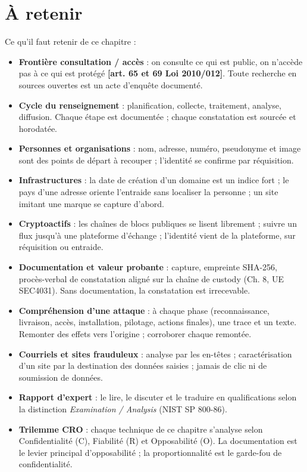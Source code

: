 \section{À retenir}

\begin{boxresume}
Ce qu'il faut retenir de ce chapitre :

\begin{itemize}
\item \textbf{Frontière consultation / accès} : on consulte ce qui est public, on n'accède pas à ce qui est protégé \textbf{[art. 65 et 69 Loi 2010/012]}. Toute recherche en sources ouvertes est un acte d'enquête documenté.

\item \textbf{Cycle du renseignement} : planification, collecte, traitement, analyse, diffusion. Chaque étape est documentée ; chaque constatation est sourcée et horodatée.

\item \textbf{Personnes et organisations} : nom, adresse, numéro, pseudonyme et image sont des points de départ à recouper ; l'identité se confirme par réquisition.

\item \textbf{Infrastructures} : la date de création d'un domaine est un indice fort ; le pays d'une adresse oriente l'entraide sans localiser la personne ; un site imitant une marque se capture d'abord.

\item \textbf{Cryptoactifs} : les chaînes de blocs publiques se lisent librement ; suivre un flux jusqu'à une plateforme d'échange ; l'identité vient de la plateforme, sur réquisition ou entraide.

\item \textbf{Documentation et valeur probante} : capture, empreinte SHA-256, procès-verbal de constatation aligné sur la chaîne de custody (Ch. 8, UE SEC4031). Sans documentation, la constatation est irrecevable.

\item \textbf{Compréhension d'une attaque} : à chaque phase (reconnaissance, livraison, accès, installation, pilotage, actions finales), une trace et un texte. Remonter des effets vers l'origine ; corroborer chaque remontée.

\item \textbf{Courriels et sites frauduleux} : analyse par les en-têtes ; caractérisation d'un site par la destination des données saisies ; jamais de clic ni de soumission de données.

\item \textbf{Rapport d'expert} : le lire, le discuter et le traduire en qualifications selon la distinction \textit{Examination / Analysis} (NIST SP 800-86).

\item \textbf{Trilemme CRO} : chaque technique de ce chapitre s'analyse selon Confidentialité (C), Fiabilité (R) et Opposabilité (O). La documentation est le levier principal d'opposabilité ; la proportionnalité est le garde-fou de confidentialité.
\end{itemize}
\end{boxresume}